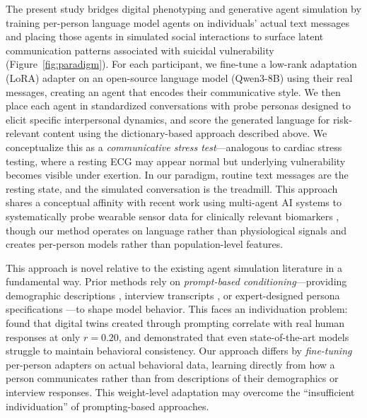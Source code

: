 \documentclass[review,12pt,authoryear]{elsarticle}
\begin{document}
The present study bridges digital phenotyping and generative agent simulation by training per-person language model agents on individuals' actual text messages and placing those agents in simulated social interactions to surface latent communication patterns associated with suicidal vulnerability (Figure~\ref{fig:paradigm}). For each participant, we fine-tune a low-rank adaptation (LoRA) adapter on an open-source language model (Qwen3-8B) using their real messages, creating an agent that encodes their communicative style. We then place each agent in standardized conversations with probe personas designed to elicit specific interpersonal dynamics, and score the generated language for risk-relevant content using the dictionary-based approach described above. We conceptualize this as a \textit{communicative stress test}---analogous to cardiac stress testing, where a resting ECG may appear normal but underlying vulnerability becomes visible under exertion. In our paradigm, routine text messages are the resting state, and the simulated conversation is the treadmill. This approach shares a conceptual affinity with recent work using multi-agent AI systems to systematically probe wearable sensor data for clinically relevant biomarkers \citep{kim2025codas}, though our method operates on language rather than physiological signals and creates per-person models rather than population-level features.

This approach is novel relative to the existing agent simulation literature in a fundamental way. Prior methods rely on \textit{prompt-based conditioning}---providing demographic descriptions \citep{argyle2023silicon}, interview transcripts \citep{park2024generative}, or expert-designed persona specifications \citep{louie2024roleplay}---to shape model behavior. This faces an individuation problem: \citet{peng2025funhouse} found that digital twins created through prompting correlate with real human responses at only $r = 0.20$, and \citet{li2025behaviorchain} demonstrated that even state-of-the-art models struggle to maintain behavioral consistency. Our approach differs by \textit{fine-tuning} per-person adapters on actual behavioral data, learning directly from how a person communicates rather than from descriptions of their demographics or interview responses. This weight-level adaptation may overcome the ``insufficient individuation'' of prompting-based approaches.

\end{document}

